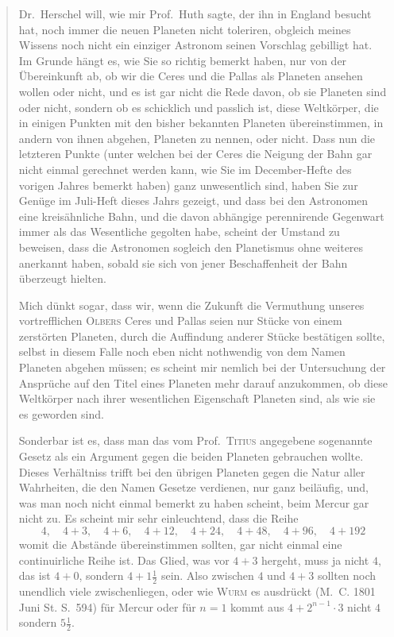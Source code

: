 \documentclass[11pt,a4paper]{book}
\begin{document}
\begin{quotation}
\glqq Dr.~Herschel will, wie mir Prof.~Huth sagte, der ihn in England besucht hat, noch immer die neuen Planeten nicht toleriren, obgleich meines Wissens noch nicht ein einziger Astronom seinen Vorschlag gebilligt hat. Im Grunde hängt es, wie Sie so richtig bemerkt haben, nur von der Übereinkunft ab, ob wir die Ceres und die Pallas als Planeten ansehen wollen oder nicht, und es ist gar nicht die Rede davon, ob sie Planeten sind oder nicht, sondern ob es schicklich und passlich ist, diese Weltkörper, die in einigen Punkten mit den bisher bekannten Planeten übereinstimmen, in andern von ihnen abgehen, Planeten zu nennen, oder nicht. Dass nun die letzteren Punkte (unter welchen bei der Ceres die Neigung der Bahn gar nicht einmal gerechnet werden kann, wie Sie im December-Hefte des vorigen Jahres bemerkt haben) ganz unwesentlich sind, haben Sie zur Genüge im Juli-Heft dieses Jahrs gezeigt, und dass bei den Astronomen eine kreisähnliche Bahn, und die davon abhängige perennirende Gegenwart immer als das Wesentliche gegolten habe, scheint der Umstand zu beweisen, dass die Astronomen sogleich den Planetismus ohne weiteres anerkannt haben, sobald sie sich von jener Beschaffenheit der Bahn überzeugt hielten.

Mich dünkt sogar, dass wir, wenn die Zukunft die Vermuthung unseres vortrefflichen \textsc{Olbers} Ceres und Pallas seien nur Stücke von einem zerstörten Planeten, durch die Auffindung anderer Stücke bestätigen sollte, selbst in diesem Falle noch eben nicht nothwendig von dem Namen Planeten abgehen müssen; es scheint mir nemlich bei der Untersuchung der Ansprüche auf den Titel eines Planeten mehr darauf anzukommen, ob diese Weltkörper nach ihrer wesentlichen Eigenschaft Planeten sind, als wie sie es geworden sind.

Sonderbar ist es, dass man das vom Prof.~\textsc{Titius} angegebene sogenannte Gesetz als ein Argument gegen die beiden Planeten gebrauchen wollte. Dieses Verhältniss trifft bei den übrigen Planeten gegen die Natur aller Wahrheiten, die den Namen Gesetze verdienen, nur ganz beiläufig, und, was man noch nicht einmal bemerkt zu haben scheint, beim Mercur gar nicht zu. Es scheint mir sehr einleuchtend, dass die Reihe
\[
4, \quad 4+3, \quad 4+6, \quad 4+12, \quad 4+24, \quad 4+48, \quad 4+96, \quad 4+192
\]
womit die Abstände übereinstimmen sollten, gar nicht einmal eine continuirliche Reihe ist. Das Glied, was vor $4+3$ hergeht, muss ja nicht $4$, das ist $4+0$, sondern $4+1\frac{1}{2}$ sein. Also zwischen $4$ und $4+3$ sollten noch unendlich viele zwischenliegen, oder wie \textsc{Wurm} es ausdrückt (M.~C. 1801 Juni St. S.~594) für Mercur oder für $n=1$ kommt aus $4+2^{n-1}\cdot 3$ nicht $4$ sondern $5\frac{1}{2}$.


\end{quotation}
\end{document}
